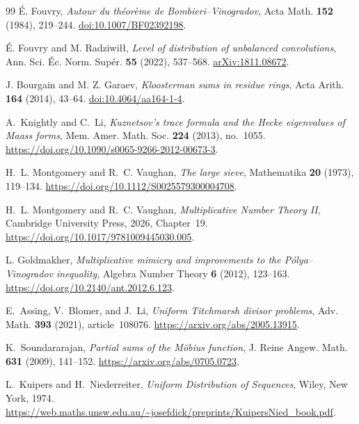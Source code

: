\documentclass[11pt,a4paper]{article}
\numberwithin{equation}{section}
\begin{document}
{\begin{thebibliography}{99}
\'E. Fouvry,
\emph{Autour du th\'eor\`eme de Bombieri--Vinogradov},
Acta Math. \textbf{152} (1984), 219--244.
\href{https://doi.org/10.1007/BF02392198}{doi:10.1007/BF02392198}.

\'E. Fouvry and M. Radziwi{\l}{\l},
\emph{Level of distribution of unbalanced convolutions},
Ann. Sci. \'Ec. Norm. Sup\'er. \textbf{55} (2022), 537--568.
\href{https://arxiv.org/abs/1811.08672}{arXiv:1811.08672}.

J. Bourgain and M. Z. Garaev,
\emph{Kloosterman sums in residue rings},
Acta Arith. \textbf{164} (2014), 43--64.
\href{https://doi.org/10.4064/aa164-1-4}{doi:10.4064/aa164-1-4}.

A.~Knightly and C.~Li,
\newblock \emph{Kuznetsov's trace formula and the Hecke eigenvalues
of Maass forms},
\newblock Mem. Amer. Math. Soc. \textbf{224} (2013), no.~1055.
\newblock \url{https://doi.org/10.1090/s0065-9266-2012-00673-3}.

H.~L. Montgomery and R.~C. Vaughan,
\newblock \emph{The large sieve},
\newblock Mathematika \textbf{20} (1973), 119--134.
\newblock \url{https://doi.org/10.1112/S0025579300004708}.

H.~L. Montgomery and R.~C. Vaughan,
\newblock \emph{Multiplicative Number Theory II}, Cambridge
University Press, 2026, Chapter~19.
\newblock \url{https://doi.org/10.1017/9781009445030.005}.

L. Goldmakher,
\newblock \emph{Multiplicative mimicry and improvements to the
P\'olya--Vinogradov inequality},
\newblock Algebra Number Theory \textbf{6} (2012), 123--163.
\newblock \url{https://doi.org/10.2140/ant.2012.6.123}.

E.~Assing, V.~Blomer, and J.~Li,
\newblock \emph{Uniform Titchmarsh divisor problems},
\newblock Adv. Math. \textbf{393} (2021), article~108076.
\newblock \url{https://arxiv.org/abs/2005.13915}.

K.~Soundararajan,
\newblock \emph{Partial sums of the M\"obius function},
\newblock J. Reine Angew. Math. \textbf{631} (2009), 141--152.
\newblock \url{https://arxiv.org/abs/0705.0723}.

L.~Kuipers and H.~Niederreiter,
\newblock \emph{Uniform Distribution of Sequences},
\newblock Wiley, New York, 1974.
\newblock \url{https://web.maths.unsw.edu.au/~josefdick/preprints/KuipersNied_book.pdf}.


\end{thebibliography}}
\end{document}
